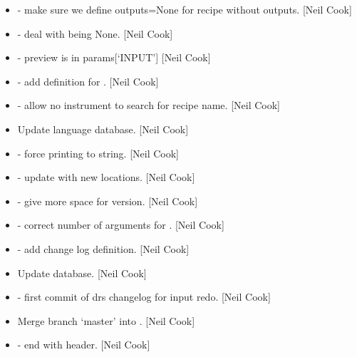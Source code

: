 \documentclass[a4paper,10pt,english]{report}
\begin{document}
\begin{itemize}
\item {} 
 - make sure we define outputs=None for recipe without
outputs. {[}Neil Cook{]}

\item {} 
 - deal with  being None. {[}Neil Cook{]}

\item {} 
 - preview is in params{[}‘INPUT’{]} {[}Neil Cook{]}

\item {} 
 - add definition for . {[}Neil Cook{]}

\item {} 
 - allow no instrument to search for recipe name. {[}Neil
Cook{]}

\item {} 
Update language database. {[}Neil Cook{]}

\item {} 
 - force printing to string. {[}Neil Cook{]}

\item {} 
 - update with new locations. {[}Neil Cook{]}

\item {} 
 - give more space for version. {[}Neil Cook{]}

\item {} 
 - correct number of arguments for
. {[}Neil Cook{]}

\item {} 
 - add change log definition. {[}Neil Cook{]}

\item {} 
Update database. {[}Neil Cook{]}

\item {} 
 - first commit of drs changelog for input redo. {[}Neil
Cook{]}

\item {} 
Merge branch ‘master’ into . {[}Neil Cook{]}

\item {} 
 - end with header. {[}Neil Cook{]}


\end{itemize}
\end{document}
